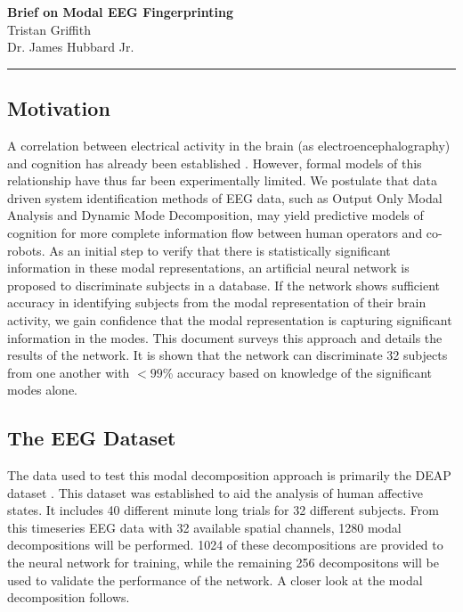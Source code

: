 \rhead{\today}
\begin{center}
{\textbf{\Large Brief on Modal EEG Fingerprinting}}\\
\vspace{2mm}
{\large  Tristan Griffith}\\
\vspace{2mm}
{\large Dr. James Hubbard Jr.}
\noindent\rule{\textwidth}{2pt}
\end{center}

\subsection{Motivation}
A correlation between electrical activity in the brain (as electroencephalography) and cognition has already been established \cite{alarcao2017emotions}. However, formal models of this relationship have thus far been experimentally limited. We postulate that data driven system identification methods of EEG data, such as Output Only Modal Analysis and Dynamic Mode Decomposition, may yield predictive models of cognition for more complete information flow between human operators and co-robots. As an initial step to verify that there is statistically significant information in these modal representations, an artificial neural network is proposed to discriminate subjects in a database. If the network shows sufficient accuracy in identifying subjects from the modal representation of their brain activity, we gain confidence that the modal representation is capturing significant information in the modes. This document surveys this approach and details the results of the network. It is shown that the network can discriminate 32 subjects from one another with $<99$\% accuracy based on knowledge of the significant modes alone.
\subsection{The EEG Dataset}
The data used to test this modal decomposition approach is primarily the DEAP dataset \cite{koelstra2011deap}. This dataset was established to aid the analysis of human affective states. It includes 40 different minute long  trials for 32 different subjects. From this timeseries EEG data with 32 available spatial channels, 1280 modal decompositions will be performed. 1024 of these decompositions are provided to the neural network for training, while the remaining 256 decompositons will be used to validate the performance of the network. A closer look at the modal decomposition follows.
